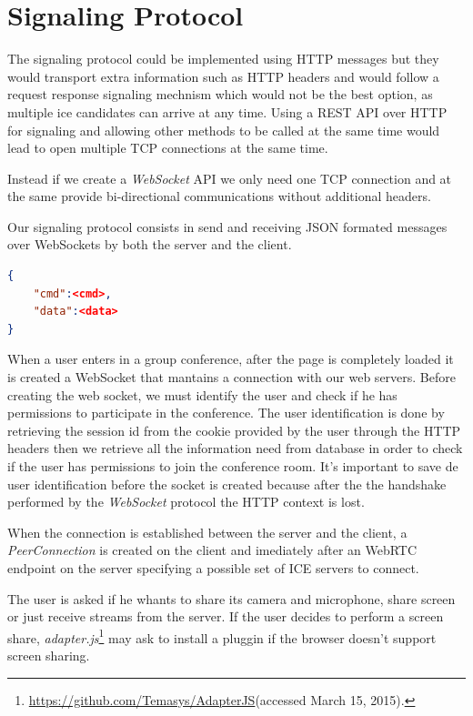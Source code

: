 \section{Signaling Protocol}

The signaling protocol could be implemented using \ac{HTTP} messages but they would transport extra information such as \ac{HTTP} headers and would follow a request response signaling mechnism which would not be the best option, as multiple ice candidates can arrive at any time. Using a \ac{REST} \ac{API} over \ac{HTTP} for signaling and allowing other methods to be called at the same time would lead to open multiple \ac{TCP} connections at the same time.

Instead if we create a \emph{WebSocket} \ac{API} we only need one \ac{TCP} connection and at the same provide bi-directional communications without additional headers.

Our signaling protocol consists in send and receiving JSON formated messages over WebSockets by both the server and the client. 

\begin{lstlisting}[caption={General structure of our WebSocket messages},language=json]
{
	"cmd":<cmd>,
	"data":<data>
}
\end{lstlisting}

When a user enters in a group conference, after the page is completely loaded it is created a WebSocket that mantains a connection with our web servers. 
Before creating the web socket, we must identify the user and check if he has permissions to participate in the conference. The user identification is done by retrieving the session id from the cookie provided by the user through the \ac{HTTP} headers then we retrieve all the information need from database in order to check if the user has permissions to join the conference room. It's important to save de user identification before the socket is created because after the the handshake performed by the \emph{WebSocket} protocol\cite{rfc6455} the \ac{HTTP} context is lost.

When the connection is established between the server and the client, a \emph{PeerConnection} is created on the client and imediately after an \ac{WebRTC} endpoint on the server specifying a possible set of \ac{ICE} servers to connect.

The user is asked if he whants to share its camera and microphone, share screen or just receive streams from the server. If the user decides to perform a screen share, \emph{adapter.js}\footnote{\url{https://github.com/Temasys/AdapterJS}(accessed March 15, 2015).} may ask to install a pluggin if the browser doesn't support screen sharing.

